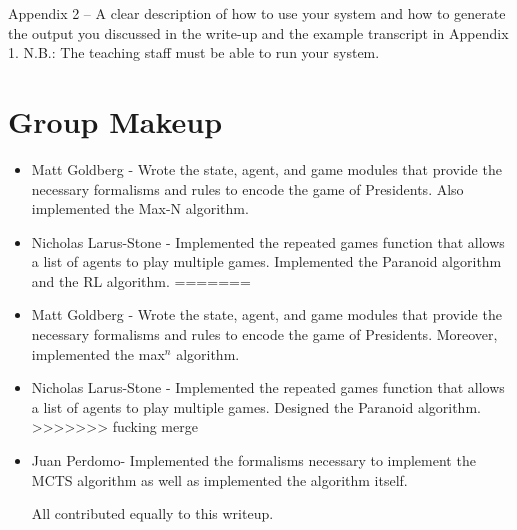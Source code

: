 \documentclass[11pt]{article}
\begin{document}
 Appendix 2 – A clear description of how to use your system and how to generate the output you discussed in the write-up and the example transcript in Appendix 1. N.B.: The teaching staff must be able to run your system.

\section{Group Makeup}

\begin{itemize}
<<<<<<< 735bb4bb37d26294dab751bd08291800aabcf33e
\item Matt Goldberg - Wrote the state, agent, and game modules that provide the necessary formalisms and rules to encode the game of Presidents. Also implemented the Max-N algorithm.
\item Nicholas Larus-Stone - Implemented the repeated games function that allows a list of agents to play multiple games. Implemented the Paranoid algorithm and the RL algorithm.
=======
\item Matt Goldberg - Wrote the state, agent, and game modules that provide the necessary formalisms and rules to encode the game of Presidents. Moreover, implemented the max$^n$ algorithm.
\item Nicholas Larus-Stone - Implemented the repeated games function that allows a list of agents to play multiple games. Designed the Paranoid algorithm.
>>>>>>> fucking merge
\item Juan Perdomo-  Implemented the formalisms necessary to implement the MCTS algorithm as well as implemented the algorithm itself.

All contributed equally to this writeup.
\end{itemize}
\end{document}
